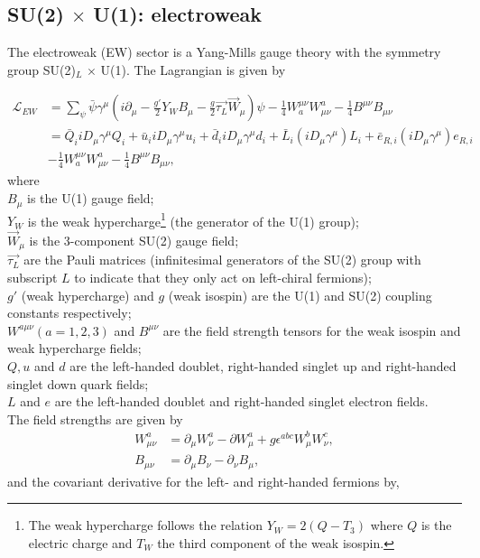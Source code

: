 \subsection{SU(2) $\times$ U(1): electroweak}
\label{subsec:ew}
The electroweak (EW) sector is a Yang-Mills gauge theory with the symmetry group SU(2)$_L$ $\times$ U(1). The Lagrangian is given by

\begin{equation}
\label{eq:EW}
\begin{split}
\mathcal{L}_{EW} &= \sum_{\psi} \bar{\psi} \gamma^\mu \left(i\partial_\mu -  \frac{g'}{2}Y_W B_\mu - \frac{g}{2} \overrightarrow{\tau_L} \overrightarrow{W}_\mu \right) \psi - \frac{1}{4} W^{\mu\nu}_a W^{a}_{\mu\nu} -\frac{1}{4} B^{\mu\nu} B_{\mu\nu} \\ 
&= \bar{Q}_i i D_\mu \gamma^\mu Q_i + \bar{u}_i i D_\mu \gamma^\mu u_i + \bar{d}_i i D_\mu \gamma^\mu d_i + \bar{L}_i\left(iD_\mu\gamma^\mu\right)L_i + \bar{e}_{R,i}\left(iD_\mu\gamma^\mu\right)e_{R,i} \\ &
- \frac{1}{4} W^{\mu\nu}_a W^{a}_{\mu\nu} -\frac{1}{4} B^{\mu\nu} B_{\mu\nu},
\end{split}
\end{equation}
where\\
\indent $B_\mu$ is the U(1) gauge field;\\
\indent $Y_W$ is the weak hypercharge\footnote{The weak hypercharge follows the relation $Y_W = 2\left(Q-T_3\right)$ where $Q$ is the electric charge and $T_W$ the third component of the weak isospin.} (the generator of the U(1) group);\\
\indent $\overrightarrow{W}_\mu$ is the 3-component SU(2) gauge field;\\
\indent $\overrightarrow{\tau_L}$ are the Pauli matrices (infinitesimal generators of the SU(2) group with subscript $L$ to indicate that they only act on left-chiral fermions);\\
\indent $g'$ (weak hypercharge) and $g$ (weak isospin) are the U(1) and SU(2) coupling constants respectively;\\
\indent $W^{a\mu\nu} (a=1,2,3)$ and $B^{\mu\nu}$ are the field strength tensors for the weak isospin and weak hypercharge fields;\\
\indent $Q, u$ and $d$ are the left-handed doublet, right-handed singlet up and right-handed singlet down quark fields;\\
\indent $L$ and $e$ are the left-handed doublet and right-handed singlet electron fields.
\\
The field strengths are given by
\begin{equation*}
\begin{split}
W^a_{\mu\nu} &= \partial_\mu W^a_\nu - \partial W^a_\mu + g \epsilon^{abc}W^b_\mu W^c_\nu,\\
B_{\mu\nu} &= \partial_\mu B_\nu - \partial_\nu B_\mu,
\end{split}
\end{equation*}
\noindent and the covariant derivative for the left- and right-handed fermions by,


